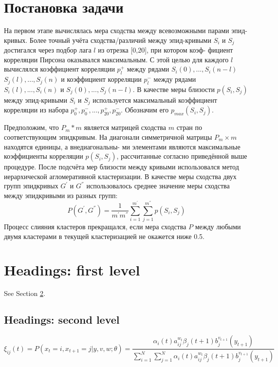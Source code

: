 \documentclass{article}
\begin{document}
\section{Постановка задачи}
На первом этапе вычислялась мера сходства между всевозможными парами эпид-кривых. Более точный учёта сходства/различий между
эпид-кривыми $S_i$ и $S_j$ достигался через подбор лага $l$ из отрезка [0,20], при котором коэф-
фициент корреляции Пирсона оказывался максимальным. С этой целью для каждого $l$ вычислялся коэффициент корреляции $p^+_l$
между рядами $S_i (0), . . . , S_i (n - l)$  $S_j (l), . . . , S_j (n)$ и коэффициент корреляции $p^−_l$ между рядами $S_i (l), . . . , S_i (n)$ и $S_j (0), . . . , S_j (n − l)$. В качестве меры близости $p(S_i, S_j)$ между эпид-кривыми $S_i$ и $S_j$ используется максимальный коэффициент корреляции из набора $p^+_0, p^-_0, ..., p^+_20, p^-_20$. Обозначим его $p_{max}(S_i, S_j)$.

Предположим, что $P_m*m$ является матрицей сходства $m$ стран по соответствующим эпидкривым. На диагонали симметричной матрицы $P_m×m$ находятся единицы, а внедиагональны-
ми элементами являются максимальные коэффициенты корреляции $p(S_i, S_j )$, рассчитанные согласно приведённой выше процедуре. После подсчёта мер близости между кривыми использовался метод иерархической агломеративной кластеризации. В качестве меры сходства двух групп эпидкривых $G^{'}$ и $G^{''}$ использовалось среднее значение меры сходства между эпидкривыми из разных групп:
$$P(G^{'}, G^{''}) = \frac{1}{m^{'}m^{''}}\sum_{i=1}^{m^{'}}\sum_{j=1}^{m^{''}}p(S_i, S_j) $$
Процесс слияния кластеров прекращался, если мера сходства $P$ между любыми двумя кластерами в текущей кластеризацией не окажется ниже 0.5.



\section{Headings: first level}
\label{sec:headings}

\lipsum[4] See Section \ref{sec:headings}.

\subsection{Headings: second level}
\lipsum[5]
\begin{equation}
	\xi _{ij}(t)=P(x_{t}=i,x_{t+1}=j|y,v,w;\theta)= {\frac {\alpha _{i}(t)a^{w_t}_{ij}\beta _{j}(t+1)b^{v_{t+1}}_{j}(y_{t+1})}{\sum _{i=1}^{N} \sum _{j=1}^{N} \alpha _{i}(t)a^{w_t}_{ij}\beta _{j}(t+1)b^{v_{t+1}}_{j}(y_{t+1})}}
\end{equation}
\end{document}
